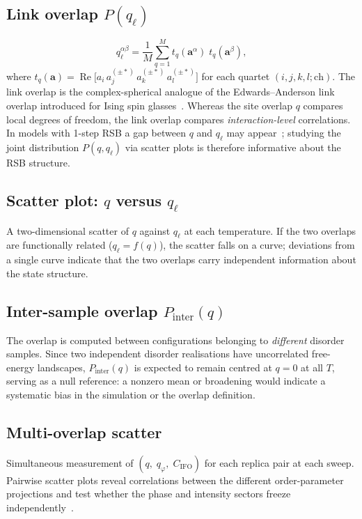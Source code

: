 \documentclass[11pt,a4paper]{article}
\newcommand{\re}{\operatorname{Re}}
\begin{document}
\subsection{Link overlap $P(q_{\ell})$}\label{sec:link}
\begin{equation}
  q_{\ell}^{\alpha\beta}
  = \frac{1}{M}\sum_{q=1}^{M}
    t_q(\bm{a}^{\alpha})\;t_q(\bm{a}^{\beta}),
\end{equation}
where $t_q(\bm{a}) = \re\bigl[a_i\,a_j^{(\pm*)}\,a_k^{(\pm*)}\,a_l^{(\pm*)}\bigr]$
for each quartet $(i,j,k,l;\mathrm{ch})$.
The link overlap is the complex-spherical analogue of the
Edwards--Anderson link overlap introduced for Ising spin
glasses~\cite{EdwardsAnderson1975,ContucciGiardina2005}.
Whereas the site overlap $q$ compares local degrees of
freedom, the link overlap compares \emph{interaction-level}
correlations.  In models with 1-step RSB a gap between
$q$ and $q_\ell$ may appear~\cite{ContucciGiardina2005};
studying the joint distribution $P(q,q_\ell)$ via scatter
plots is therefore informative about the RSB structure.

\subsection{Scatter plot: $q$ versus $q_\ell$}
A two-dimensional scatter of $q$ against $q_\ell$ at each
temperature.  If the two overlaps are functionally related
($q_\ell = f(q)$), the scatter falls on a curve; deviations
from a single curve indicate that the two overlaps carry
independent information about the state structure.

\subsection{Inter-sample overlap $P_{\mathrm{inter}}(q)$}
The overlap is computed between configurations belonging to
\emph{different} disorder samples.  Since two independent disorder
realisations have uncorrelated free-energy landscapes,
$P_{\mathrm{inter}}(q)$ is expected to remain centred at $q=0$ at
all $T$, serving as a null reference:
a nonzero mean or broadening would indicate a systematic bias in
the simulation or the overlap definition.

\subsection{Multi-overlap scatter}
Simultaneous measurement of $(q,\;q_\varphi,\;C_{\mathrm{IFO}})$ for
each replica pair at each sweep.  Pairwise scatter plots reveal
correlations between the different order-parameter projections and
test whether the phase and intensity sectors freeze
independently~\cite{Antenucci2015b}.
\end{document}

